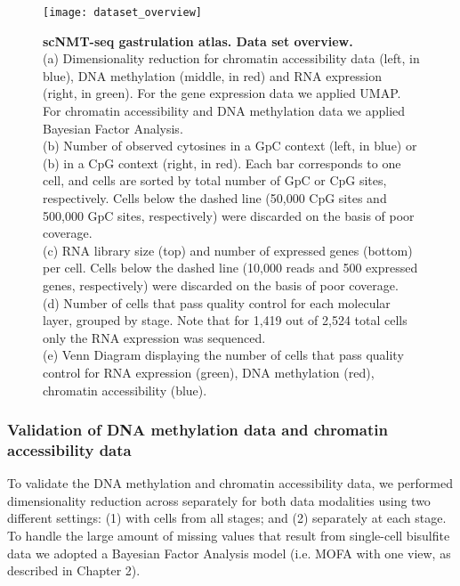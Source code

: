 \begin{figure}[H]
	\centering
	\texttt{[image: dataset\_overview]}
	\caption[]{\textbf{scNMT-seq gastrulation atlas. Data set overview.}\\
	(a) Dimensionality reduction for chromatin accessibility data (left, in blue), DNA methylation (middle, in red) and RNA expression (right, in green). For the gene expression data we applied UMAP\cite{McInnes2018}. For chromatin accessibility and DNA methylation data we applied Bayesian Factor Analysis\cite{Argelaguet2018}.\\
	(b) Number of observed cytosines in a GpC context (left, in blue) or (b) in a CpG context (right, in red). Each bar corresponds to one cell, and cells are sorted by total number of GpC or CpG sites, respectively. Cells below the dashed line (50,000 CpG sites and 500,000 GpC sites, respectively) were discarded on the basis of poor coverage. \\
	(c) RNA library size (top) and number of expressed genes (bottom) per cell. Cells below the dashed line (10,000 reads and 500 expressed genes, respectively) were discarded on the basis of poor coverage. \\
	(d) Number of cells that pass quality control for each molecular layer, grouped by stage. Note that for 1,419 out of 2,524 total cells only the RNA expression was sequenced.\\
	(e) Venn Diagram displaying the number of cells that pass quality control for RNA expression (green), DNA methylation (red), chromatin accessibility (blue).
	}
	\label{fig:dataset_overview}
\end{figure}


\subsubsection{Validation of DNA methylation data and chromatin accessibility data}

To validate the DNA methylation and chromatin accessibility data, we performed dimensionality reduction across separately for both data modalities using two different settings: (1) with cells from all stages; and (2) separately at each stage. To handle the large amount of missing values that result from single-cell bisulfite data we adopted a Bayesian Factor Analysis model (i.e. MOFA with one view, as described in Chapter 2). 

